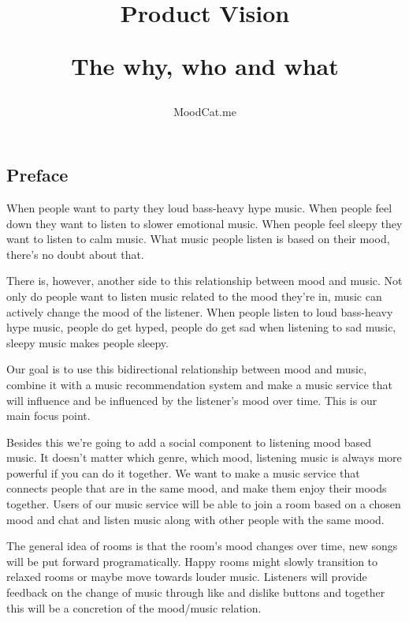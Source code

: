 \documentclass[10pt,a4paper]{article}
\begin{document}
\title{Product Vision\\
	\begin{small}
	The why, who and what
	\end{small}
}
\author{MoodCat.me}
\maketitle

\subsection*{Preface}

When people want to party they loud bass-heavy hype music.
When people feel down they want to listen to slower emotional music.
When people feel sleepy they want to listen to calm music.
What music people listen is based on their mood, there's no doubt about that.

There is, however, another side to this relationship between mood and music.
Not only do people want to listen music related to the mood they're in,
music can actively change the mood of the listener.
When people listen to loud bass-heavy hype music, people do get hyped,
people do get sad when listening to sad music,
sleepy music makes people sleepy.

Our goal is to use this bidirectional relationship between mood and music,
combine it with a music recommendation system and make a music service
that will influence and be influenced by the listener's mood over time.
This is our main focus point.

Besides this we're going to add a social component to listening mood based music.
It doesn't matter which genre, which mood, listening music is always more powerful if you can do it together.
We want to make a music service that connects people that are in the same mood, and make them enjoy their moods together.
Users of our music service will be able to join a room based on a chosen mood and chat and listen music along with other people with the same mood.

The general idea of rooms is that the room's mood changes over time, new songs will be put forward programatically. Happy rooms might slowly 
transition to relaxed rooms or maybe move towards louder music. Listeners will provide feedback on the change of music through like and dislike
buttons and together this will be a concretion of the mood/music relation.
\end{document}
